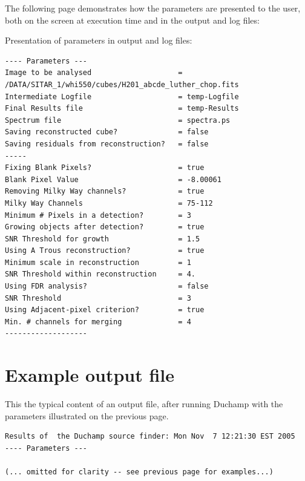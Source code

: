 \documentclass[12pt]{article}
\begin{document}
The following page demonstrates how the parameters are presented to
the user, both on the screen at execution time and in the output and
log files:
\newpage
\begin{landscape}
Presentation of parameters in output and log files:  
\begin{verbatim}
---- Parameters ---
Image to be analysed                    = /DATA/SITAR_1/whi550/cubes/H201_abcde_luther_chop.fits
Intermediate Logfile                    = temp-Logfile
Final Results file                      = temp-Results
Spectrum file                           = spectra.ps
Saving reconstructed cube?              = false
Saving residuals from reconstruction?   = false
-----
Fixing Blank Pixels?                    = true
Blank Pixel Value                       = -8.00061
Removing Milky Way channels?            = true
Milky Way Channels                      = 75-112
Minimum # Pixels in a detection?        = 3
Growing objects after detection?        = true
SNR Threshold for growth                = 1.5
Using A Trous reconstruction?           = true
Minimum scale in reconstruction         = 1
SNR Threshold within reconstruction     = 4.
Using FDR analysis?                     = false
SNR Threshold                           = 3
Using Adjacent-pixel criterion?         = true
Min. # channels for merging             = 4
-------------------
\end{verbatim}

\newpage
\section{Example output file}
\label{app-output}
This the typical content of an output file, after running Duchamp
with the parameters illustrated on the previous page.

{\scriptsize 
  \begin{verbatim}
Results of  the Duchamp source finder: Mon Nov  7 12:21:30 EST 2005
---- Parameters ---

(... omitted for clarity -- see previous page for examples...)


\end{verbatim}}
\end{landscape}
\end{document}
